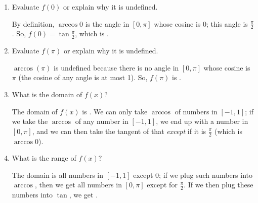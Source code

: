 \documentclass{article}
\begin{document}
\begin{enumerate}
\begin{enumerate}
  \item
    \begin{problem}[\vfill]
      Evaluate $f(0)$ or explain why it is undefined.
    \end{problem}

    \begin{solution}
      By definition, $\arccos 0$ is the angle in $[0, \pi]$ whose cosine
      is $0$; this angle is $\frac{\pi}{2}$.  So, $f(0) = \tan
      \frac{\pi}{2}$, which is .
    \end{solution}

  \item
    \begin{problem}[\vfill]
      Evaluate $f(\pi)$ or explain why it is undefined. 
    \end{problem}

    \begin{solution}
      $\arccos(\pi)$ is undefined because there is no angle in $[0, \pi]$
      whose cosine is $\pi$ (the cosine of any angle is at most 1).  So,
      $f(\pi)$ is .
    \end{solution}

  \item
    \begin{problem}[\vfill]
      What is the domain of $f(x)$?
    \end{problem}

    \begin{solution}
      The domain of $f(x)$ is .
      We can only take $\arccos$ of numbers in $[-1, 1]$; if we take the
      $\arccos$ of any number in $[-1, 1]$, we end up with a number in
      $[0, \pi]$, and we can then take the tangent of that \emph{except}
      if it is $\frac{\pi}{2}$ (which is $\arccos 0$).
    \end{solution}

  \item
    \begin{problem}[\vfill]
      What is the range of $f(x)$?
    \end{problem}

    \begin{solution}
      The domain is all numbers in $[-1, 1]$ except 0; if we plug such
      numbers into $\arccos$, then we get all numbers in $[0, \pi]$ except
      for $\frac{\pi}{2}$.  If we then plug these numbers into $\tan$, we
      get .
    \end{solution}
    \end{enumerate}


\end{enumerate}
\end{document}
